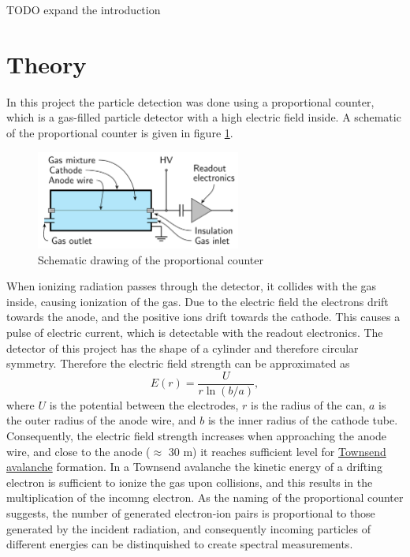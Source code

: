 \documentclass[a4paper]{article}
\begin{document}
TODO expand the introduction


\section{Theory}
\label{theory}


In this project the particle detection was done using a proportional counter, which is a gas-filled particle detector with a high electric field inside.
\cite{instructions}
A schematic of the proportional counter is given in figure \ref{fig:theory_schematic}.

\begin{figure}[ht!]
\centering
\includegraphics[width=0.6\textwidth]{fig/article/schematic.png}
\caption{Schematic drawing of the proportional counter \cite{winkler_gaseous_2015}}
\label{fig:theory_schematic}
\end{figure}

When ionizing radiation passes through the detector, it collides with the gas inside, causing ionization of the gas.
Due to the electric field the electrons drift towards the anode, and the positive ions drift towards the cathode.
This causes a pulse of electric current, which is detectable with the readout electronics.
The detector of this project has the shape of a cylinder and therefore circular symmetry.
Therefore the electric field strength can be approximated as
\begin{equation}
E(r) = \frac{U}{r \ln(b/a) },
\end{equation}
where $U$ is the potential between the electrodes, $r$ is the radius of the can, $a$ is the outer radius of the anode wire, and $b$ is the inner radius of the cathode tube.
Consequently, the electric field strength increases when approaching the anode wire, and close to the anode ($\approx$ 30 \textmu m) it reaches sufficient level for
\href{https://en.wikipedia.org/wiki/Townsend_discharge}{Townsend avalanche} formation.
In a Townsend avalanche the kinetic energy of a drifting electron is sufficient to ionize the gas upon collisions, and this results in the multiplication of the incomng electron.
As the naming of the proportional counter suggests, the number of generated electron-ion pairs is proportional to those generated by the incident radiation, and consequently incoming particles of different energies can be distinquished to create spectral measurements.
\cites{winkler_gaseous_2015}[p. 159--164]{knoll_radiation_2010}
\end{document}
